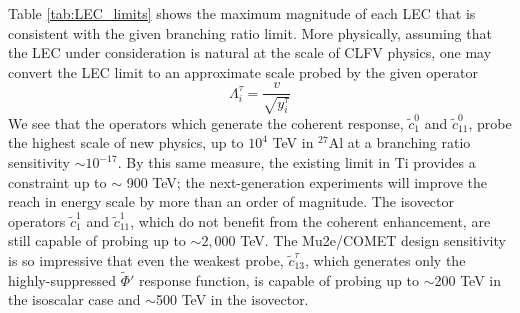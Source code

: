 \documentclass{book}[letterpaper,12pt]
\begin{document}
Table \ref{tab:LEC_limits} shows the maximum magnitude of each LEC that is consistent with the given branching ratio limit. More physically, assuming that the LEC under consideration is natural at the scale of CLFV physics, one may convert the LEC limit to an approximate scale probed by the given operator
\begin{equation}
\Lambda_i^{\tau}=\frac{v}{\sqrt{y_i^{\tau}}}
\end{equation}
We see that the operators which generate the coherent response, $\tilde{c}_1^0$ and $\tilde{c}_{11}^0$, probe the highest scale of new physics, up to $10^4$ TeV in $^{27}$Al at a branching ratio sensitivity $\sim 10^{-17}$. By this same measure, the existing limit in Ti provides a constraint up to $\sim$ 900 TeV; the next-generation experiments will improve the reach in energy scale by more than an order of magnitude. The isovector operators $\tilde{c}_1^1$ and $\tilde{c}_{11}^1$, which do not benefit from the coherent enhancement, are still capable of probing up to $\sim 2,000$ TeV. The Mu2e/COMET design sensitivity is so impressive that even the weakest probe, $\tilde{c}_{13}^{\tau}$, which generates only the highly-suppressed $\tilde{\Phi}'$ response function, is capable of probing up to $\sim$200 TeV in the isoscalar case and $\sim$500 TeV in the isovector.
\end{document}
